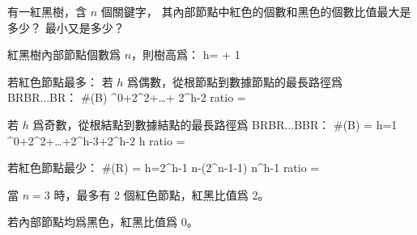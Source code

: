 \startEXERCISE
有一紅黑樹，含 $n$ 個關鍵字，
其內部節點中紅色的個數和黑色的個數比值最大是多少？
最小又是多少？
\stopEXERCISE

\startANSWER
紅黑樹內部節點個數爲 $n$，則樹高爲：
\startformula
h=\lfloor {} \rfloor + 1
\stopformula

若紅色節點最多：
\startigBase[a]
\startitem
若 $h$ 爲偶數，從根節點到數據節點的最長路徑爲 BRBR...BR：
\startsplitformula\startmathalignment
\NC \#(B) ^0+2^2+\ldots + 2^{h-2} \NR
\NC ratio \NC =  \NR
\stopmathalignment\stopsplitformula
\stopitem

\startitem
若 $h$ 爲奇數，從根結點到數據結點的最長路徑爲 BRBR...BBR：
\startsplitformula\startmathalignment
\NC \#(B) \NC = \startmathcases
{}		\MC h=1 \NR
{}^0+2^2+\ldots +2^{h-3}+2^{h-2}	\MC h \NR
\stopmathcases \NR
\NC ratio \NC =  \NR
\stopmathalignment\stopsplitformula
\stopitem
\stopigBase

若紅色節點最少：
\startsplitformula\startmathalignment
\NC \#(R) \NC = \startmathcases
{}		\MC h=2^h-1 \NR
\NC n-(2^{n-1}-1)	\MC n^h-1 \NR
\stopmathcases \NR
\NC ratio \NC =  \NR
\stopmathalignment\stopsplitformula

當 $n=3$ 時，最多有 2 個紅色節點，紅黑比值爲 2。

若內部節點均爲黑色，紅黑比值爲 0。
\stopANSWER
